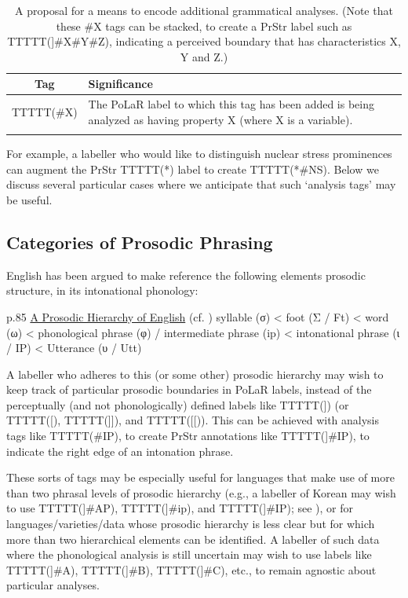 \documentclass[11pt, twoside]{memoir}
\begin{document}
\begin{longtable}{cp{.8\linewidth}} \toprule \textbf{Tag} & \textbf{Significance} \tabularnewline
\midrule \endhead
TTTTT(\#X) & The PoLaR label to which this tag has been added is being analyzed as having property X (where X is a variable). \tabularnewline
\bottomrule
\caption[A proposal for a means to encode additional grammatical analyses.]{A proposal for a means to encode additional grammatical analyses. (Note that these \#X tags can be stacked, to create a PrStr label such as TTTTT(]\#X\#Y\#Z), indicating a perceived boundary that has characteristics X, Y and Z.)}
\end{longtable}

For example, a labeller who would like to distinguish nuclear stress prominences can augment the PrStr TTTTT(*) label to create TTTTT(*\#NS). Below we discuss several particular cases where we anticipate that such ‘analysis tags’ may be useful.

\subsection{Categories of Prosodic Phrasing}\label{sec:categories-of-prosodic-phrasing}

English has been argued to make reference the following elements prosodic structure, in its intonational phonology:

\begin{longtable*}{p{.85\linewidth}}
\uline{A Prosodic Hierarchy of English} (cf. \citealt{nesporvogel86, shattuck-hufnagel-96, fery17}) \newline
syllable (σ) < foot (Σ / Ft) < word (ω) < phonological phrase (φ) / intermediate phrase (ip) < intonational phrase (ι / IP) < Utterance (υ / Utt) \\
\end{longtable*}

A labeller who adheres to this (or some other) prosodic hierarchy may wish to keep track of particular prosodic boundaries in PoLaR labels, instead of the perceptually (and not phonologically) defined labels like TTTTT(]) (or TTTTT([), TTTTT(]]), and TTTTT([[)). This can be achieved with analysis tags like TTTTT(\#IP), to create PrStr annotations like TTTTT(]\#IP), to indicate the right edge of an intonation phrase.

These sorts of tags may be especially useful for languages that make use of more than two phrasal levels of prosodic hierarchy (e.g., a labeller of Korean may wish to use TTTTT(]\#AP), TTTTT(]\#ip), and TTTTT(]\#IP); see \citealt{jun07}), or for languages\slash varieties\slash data whose prosodic hierarchy is less clear but for which more than two hierarchical elements can be identified. A labeller of such data where the phonological analysis is still uncertain may wish to use labels like TTTTT(]\#A), TTTTT(]\#B), TTTTT(]\#C), etc., to remain agnostic about particular analyses.
\end{document}
